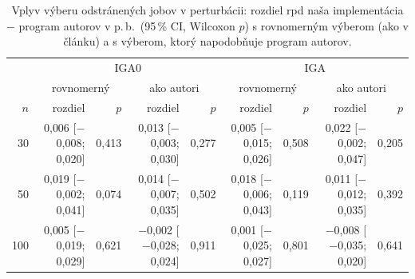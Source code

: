 \begin{table}[ht]
\centering
\scriptsize\setlength{\tabcolsep}{2pt}
\caption{Vplyv výberu odstránených jobov v perturbácii: rozdiel rpd naša implementácia $-$ program autorov v p.\,b.\ (95\,\% CI, Wilcoxon $p$) s rovnomerným výberom (ako v článku) a s výberom, ktorý napodobňuje program autorov.}
\label{tab:orig_sampling}
\begin{tabular}{r|rr|rr|rr|rr}
\toprule
 & \multicolumn{4}{c|}{IGA0} & \multicolumn{4}{c}{IGA} \\
 & \multicolumn{2}{c|}{rovnomerný} & \multicolumn{2}{c|}{ako autori} & \multicolumn{2}{c|}{rovnomerný} & \multicolumn{2}{c}{ako autori} \\
$n$ & rozdiel & $p$ & rozdiel & $p$ & rozdiel & $p$ & rozdiel & $p$ \\
\midrule
30 & 0{,}006 [$-$0{,}008; 0{,}020] & 0{,}413 & 0{,}013 [$-$0{,}003; 0{,}030] & 0{,}277 & 0{,}005 [$-$0{,}015; 0{,}026] & 0{,}508 & 0{,}022 [$-$0{,}002; 0{,}047] & 0{,}205 \\
50 & 0{,}019 [$-$0{,}002; 0{,}041] & 0{,}074 & 0{,}014 [$-$0{,}007; 0{,}035] & 0{,}502 & 0{,}018 [$-$0{,}006; 0{,}043] & 0{,}119 & 0{,}011 [$-$0{,}012; 0{,}035] & 0{,}392 \\
100 & 0{,}005 [$-$0{,}019; 0{,}029] & 0{,}621 & $-$0{,}002 [$-$0{,}028; 0{,}024] & 0{,}911 & 0{,}001 [$-$0{,}025; 0{,}027] & 0{,}801 & $-$0{,}008 [$-$0{,}035; 0{,}020] & 0{,}641 \\
\bottomrule
\end{tabular}
\end{table}
